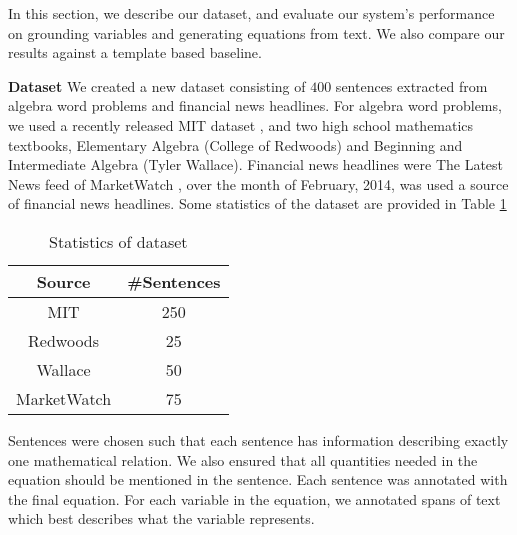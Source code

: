   In this section, we describe our dataset, and evaluate our system's
  performance on grounding variables and generating equations from
  text. We also compare our results against a template based baseline.

  \noindent \textbf{Dataset} We created a new dataset consisting of
  $400$ sentences extracted from algebra word problems and financial
  news headlines. For algebra word problems, we used a recently
  released MIT dataset \cite{KushmanZeBa14}, and two high school
  mathematics textbooks, Elementary Algebra (College of
  Redwoods) \cite{Redwoods} and Beginning and Intermediate Algebra
  (Tyler Wallace)\cite{Wallace}. Financial news headlines were The
  Latest News feed of MarketWatch \cite{MarketWatch}, over the month
  of February, 2014, was used a source of financial news
  headlines. Some statistics of the dataset are provided in
  Table \ref{tab:stats}

  \setlength{\tabcolsep}{6pt}
      \begin{table}[!ht]
        \centering \small
        \begin{tabular}{|c|c|}
          \hline 
           Source & \#Sentences \\\hline
          \hline 
           MIT & 250  \\
           Redwoods & 25 \\
           Wallace & 50 \\
           MarketWatch & 75\\
          \hline
        \end{tabular}
        \caption{\footnotesize Statistics of dataset}
        \label{tab:stats}
      \end{table}


  Sentences were chosen such that each sentence has information
  describing exactly one mathematical relation. We also ensured that
  all quantities needed in the equation should be mentioned in the
  sentence.  Each sentence was annotated with the final equation. For
  each variable in the equation, we annotated spans of text which best
  describes what the variable represents.  

